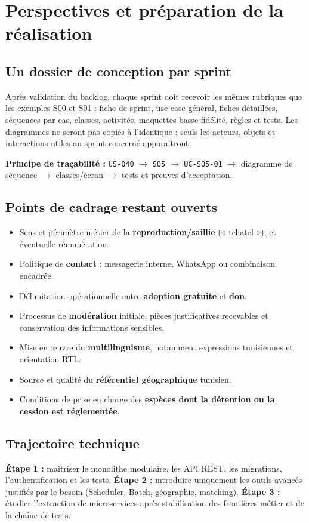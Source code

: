 \chapter{Perspectives et préparation de la réalisation}
\section{Un dossier de conception par sprint}
Après validation du backlog, chaque sprint doit recevoir les mêmes rubriques que les exemples S00 et S01 : fiche de sprint, use case général, fiches détaillées, séquences par cas, classes, activités, maquettes basse fidélité, règles et tests. Les diagrammes ne seront pas copiés à l’identique : seuls les acteurs, objets et interactions utiles au sprint concerné apparaîtront.

\begin{notebox}
\textbf{Principe de traçabilité :} \texttt{US-040} $\rightarrow$ \texttt{S05} $\rightarrow$ \texttt{UC-S05-01} $\rightarrow$ diagramme de séquence $\rightarrow$ classes/écran $\rightarrow$ tests et preuves d’acceptation.
\end{notebox}

\section{Points de cadrage restant ouverts}
\begin{itemize}
\item Sens et périmètre métier de la \textbf{reproduction/saillie} (« tchatel »), et éventuelle rémunération.
\item Politique de \textbf{contact} : messagerie interne, WhatsApp ou combinaison encadrée.
\item Délimitation opérationnelle entre \textbf{adoption gratuite} et \textbf{don}.
\item Processus de \textbf{modération} initiale, pièces justificatives recevables et conservation des informations sensibles.
\item Mise en œuvre du \textbf{multilinguisme}, notamment expressions tunisiennes et orientation RTL.
\item Source et qualité du \textbf{référentiel géographique} tunisien.
\item Conditions de prise en charge des \textbf{espèces dont la détention ou la cession est réglementée}.
\end{itemize}

\section{Trajectoire technique}
\textbf{Étape 1 :} maîtriser le monolithe modulaire, les API REST, les migrations, l’authentification et les tests. \textbf{Étape 2 :} introduire uniquement les outils avancés justifiés par le besoin (Scheduler, Batch, géographie, matching). \textbf{Étape 3 :} étudier l’extraction de microservices après stabilisation des frontières métier et de la chaîne de tests.

